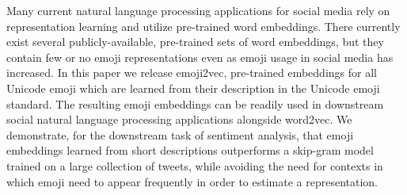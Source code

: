 Many current natural language processing applications for social media rely on representation learning and utilize pre-trained word embeddings. There currently exist several publicly-available, pre-trained sets of word embeddings, but they contain few or no emoji representations even as emoji usage in social media has increased. In this paper we release emoji2vec, pre-trained embeddings for all Unicode emoji which are learned from their description in the Unicode emoji standard. The resulting emoji embeddings can be readily used in downstream social natural language processing applications alongside word2vec. We demonstrate, for the downstream task of sentiment analysis, that emoji embeddings learned from short descriptions outperforms a skip-gram model trained on a large collection of tweets, while avoiding the need for contexts in which emoji need to appear frequently in order to estimate a representation.
